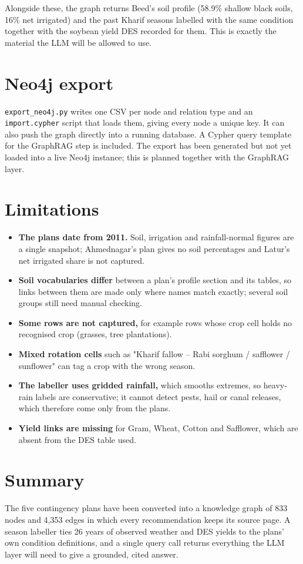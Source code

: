 Alongside these, the graph returns Beed's soil profile (58.9\% shallow black soils, 16\% net irrigated) and the past Kharif seasons labelled with the same condition together with the soybean yield DES recorded for them. This is exactly the material the LLM will be allowed to use.

\section{Neo4j export}
\texttt{export\_neo4j.py} writes one CSV per node and relation type and an \texttt{import.cypher} script that loads them, giving every node a unique key. It can also push the graph directly into a running database. A Cypher query template for the GraphRAG step is included. The export has been generated but not yet loaded into a live Neo4j instance; this is planned together with the GraphRAG layer.

\section{Limitations}
\begin{itemize}
	\item \textbf{The plans date from 2011.} Soil, irrigation and rainfall-normal figures are a single snapshot; Ahmednagar's plan gives no soil percentages and Latur's net irrigated share is not captured.
	\item \textbf{Soil vocabularies differ} between a plan's profile section and its tables, so links between them are made only where names match exactly; several soil groups still need manual checking.
	\item \textbf{Some rows are not captured,} for example rows whose crop cell holds no recognised crop (grasses, tree plantations).
	\item \textbf{Mixed rotation cells} such as "Kharif fallow -- Rabi sorghum / safflower / sunflower" can tag a crop with the wrong season.
	\item \textbf{The labeller uses gridded rainfall,} which smooths extremes, so heavy-rain labels are conservative; it cannot detect pests, hail or canal releases, which therefore come only from the plans.
	\item \textbf{Yield links are missing} for Gram, Wheat, Cotton and Safflower, which are absent from the DES table used.
\end{itemize}

\section{Summary}
The five contingency plans have been converted into a knowledge graph of 833 nodes and 4,353 edges in which every recommendation keeps its source page. A season labeller ties 26 years of observed weather and DES yields to the plans' own condition definitions, and a single query call returns everything the LLM layer will need to give a grounded, cited answer.
